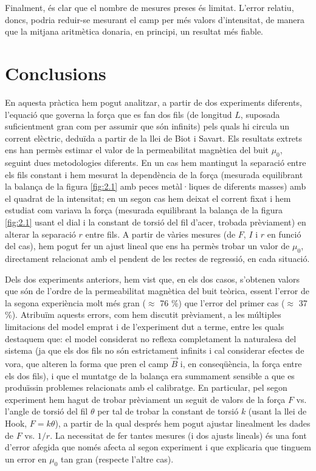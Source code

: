 \documentclass[a4paper,10.5pt]{report}
\begin{document}
Finalment, és clar que el nombre de mesures preses és limitat. L'error relatiu, doncs, podria reduir-se mesurant el camp per més valors d'intensitat, de manera que la mitjana aritmètica donaria, en principi, un resultat més fiable.


\section{Conclusions}
En aquesta pràctica hem pogut analitzar, a partir de dos experiments diferents, l'equació que governa la força que es fan dos fils (de longitud $L$, suposada suficientment gran com per assumir que són infinits) pels quals hi circula un corrent elèctric, deduïda a partir de la llei de Biot i Savart. Els resultats extrets ens han permès estimar el valor de la permeabilitat magnètica del buit $\mu_0$, seguint dues metodologies diferents. En un cas hem mantingut la separació entre els fils constant i hem mesurat la dependència de la força (mesurada equilibrant la balança de la figura \ref{fig:2.1} amb peces metàl·liques de diferents masses) amb el quadrat de la intensitat; en un segon cas hem deixat el corrent fixat i hem estudiat com variava la força (mesurada equilibrant la balança de la figura \ref{fig:2.1} usant el dial i la constant de torsió del fil d'acer, trobada prèviament) en alterar la separació $r$ entre fils. A partir de vàries mesures (de $F$, $I$ i $r$ en funció del cas), hem pogut fer un ajust lineal que ens ha permès trobar un valor de $\mu_0$, directament relacionat amb el pendent de les rectes de regressió, en cada situació.

Dels dos experiments anteriors, hem vist que, en els dos casos, s'obtenen valors que són de l'ordre de la permeabilitat magnètica del buit teòrica, essent l'error de la segona experiència molt més gran ($\approx$ 76 \%) que l'error del primer cas ($\approx$ 37 \%). Atribuïm aquests errors, com hem discutit prèviament, a les múltiples limitacions del model emprat i de l'experiment dut a terme, entre les quals destaquem que: el model considerat no reflexa completament la naturalesa del sistema (ja que els dos fils no són estrictament infinits i cal considerar efectes de vora, que alteren la forma que pren el camp $\vec{B}$ i, en conseqüència, la força entre els dos fils), i que el muntatge de la balança era summament sensible a que es produïssin problemes relacionats amb el calibratge. En particular, pel segon experiment hem hagut de trobar prèviament un seguit de valors de la força $F$ vs. l'angle de torsió del fil $\theta$ per tal de trobar la constant de torsió $k$ (usant la llei de Hook, $F=k\theta$), a partir de la qual després hem pogut ajustar linealment les dades de $F$ vs. $1/r$. La necessitat de fer tantes mesures (i dos ajusts lineals) és una font d'error afegida que només afecta al segon experiment i que explicaria que tinguem un error en $\mu_0$ tan gran (respecte l'altre cas).  
\end{document}
